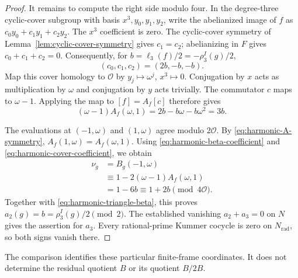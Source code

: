 \begin{proof}
It remains to compute the right side modulo four. In the degree-three
cyclic-cover subgroup with basis $x^3,y_0,y_1,y_2$, write the
abelianized image of $f$ as
$c_0y_0+c_1y_1+c_2y_2$. The $x^3$ coefficient is zero.
The cyclic-cover symmetry of
Lemma~\ref{lem:cyclic-cover-symmetry} gives $c_1=c_2$;
abelianizing in $F$ gives $c_0+c_1+c_2=0$.
Consequently, for $b=\ell_3(f)/2=-\rho_3^I(g)/2$,
\[
 (c_0,c_1,c_2)=(2b,-b,-b).
\]
Map this cover homology to $\mathcal O$ by
$y_j\mapsto\omega^j$, $x^3\mapsto0$.
Conjugation by $x$ acts as multiplication by $\omega$ and
conjugation by $y$ acts trivially. The commutator $c$ maps to
$\omega-1$. Applying the map to $[f]=A_f[c]$ therefore gives
\begin{equation}
 (\omega-1)A_f(\omega,1)
   =2b-b\omega-b\omega^2=3b.
 \label{eq:harmonic-cover-coefficient}
\end{equation}

The evaluations at $(-1,\omega)$ and $(1,\omega)$ agree
modulo $2\mathcal O$. By \eqref{eq:harmonic-A-symmetry},
$A_f(1,\omega)=A_f(\omega,1)$. Using
\eqref{eq:harmonic-beta-coefficient} and
\eqref{eq:harmonic-cover-coefficient}, we obtain
\[
 \begin{split}
 \nu_g
 &=B_g(-1,\omega)\\
 &\equiv1-2(\omega-1)A_f(\omega,1)\\
 &=1-6b\equiv1+2b\pmod{4\mathcal O}.
 \end{split}
\]
Together with \eqref{eq:harmonic-triangle-beta}, this proves
$a_2(g)=b=\rho_3^I(g)/2\pmod2$.
The established vanishing $a_2+a_3=0$ on $N$
\cite[Theorem 3]{H17} gives the assertion for $a_3$.
Every rational-prime Kummer cocycle is zero on $N_{\mathrm{rad}}$,
so both signs vanish there.
\end{proof}

The comparison identifies these particular finite-frame coordinates.
It does not determine the residual quotient $B$ or its quotient $B/2B$.
